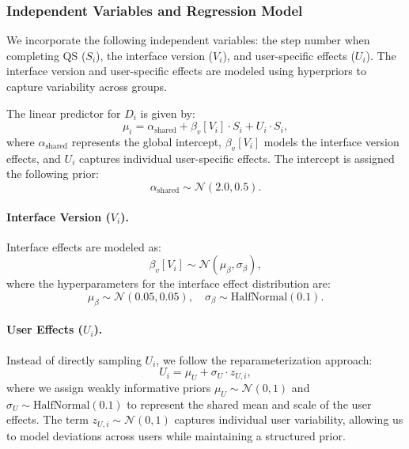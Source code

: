 \subsubsection{Independent Variables and Regression Model}
We incorporate the following independent variables: the step number when completing QS ($S_i$), the interface version ($V_i$), and user-specific effects ($U_i$). The interface version and user-specific effects are modeled using hyperpriors to capture variability across groups.

The linear predictor for $D_i$ is given by:
\begin{equation}\label{eq:model3_mu}
    \mu_i = \alpha_{\text{shared}} + \beta_v[V_i] \cdot S_i + U_i \cdot S_i,
\end{equation}
where $\alpha_{\text{shared}}$ represents the global intercept, $\beta_v[V_i]$ models the interface version effects, and $U_i$ captures individual user-specific effects. The intercept is assigned the following prior:
\begin{equation}\label{eq:model3_prior_shared}
    \alpha_{\text{shared}} \sim \mathcal{N}(2.0, 0.5).
\end{equation}

\paragraph{Interface Version ($V_i$).} Interface effects are modeled as:
\begin{equation}\label{eq:model3_prior_beta}
    \beta_v[V_i] \sim \mathcal{N}(\mu_{\beta}, \sigma_{\beta}),
\end{equation}
where the hyperparameters for the interface effect distribution are:
\begin{equation}
    \mu_{\beta} \sim \mathcal{N}(0.05, 0.05), \quad \sigma_{\beta} \sim \text{HalfNormal}(0.1).
\end{equation}

\paragraph{User Effects ($U_i$).} Instead of directly sampling $U_i$, we follow the reparameterization approach:
\begin{equation}\label{eq:model3_user_mu}
    U_i = \mu_U + \sigma_U \cdot z_{U,i},
\end{equation}
where we assign weakly informative priors $\mu_U \sim \mathcal{N}(0,1)$ and $\sigma_U \sim \text{HalfNormal}(0.1)$ to represent the shared mean and scale of the user effects. The term $z_{U,i} \sim \mathcal{N}(0,1)$ captures individual user variability, allowing us to model deviations across users while maintaining a structured prior.

